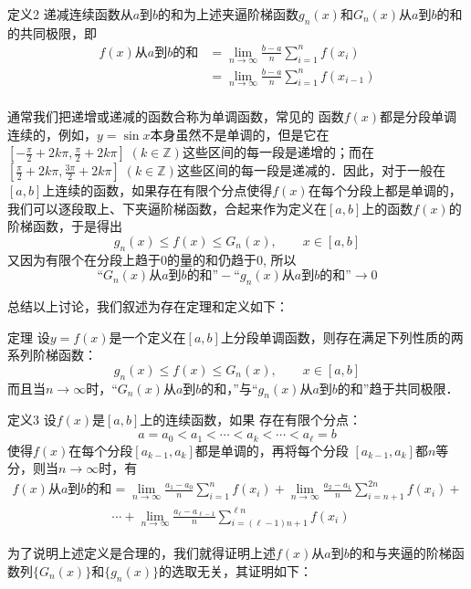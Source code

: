 \begin{blk}
    {定义2} 递减连续函数从$a$到$b$的和为上述夹逼阶梯函数$g_n(x)$和$G_n(x)$从$a$到$b$的和的共同极限，即  
\begin{align*}
    f(x)\text{从$a$到$b$的和}&=\lim_{n\to\infty} \frac{b-a}{n}\sum^n_{i=1}f(x_i)\\
    &=\lim_{n\to\infty} \frac{b-a}{n}\sum^n_{i=1}f(x_{i-1})\\
\end{align*}
\end{blk}

通常我们把递增或递减的函数合称为单调函数，常见的
函数$f(x)$都是分段单调连续的，例如，$y=\sin x$本身虽然不是单调的，但是它在$\left[-\frac{\pi}{2}+2k\pi,\frac{\pi}{2}+2k\pi\right]\; (k\in\mathbb{Z})$这些区间的每一段是递增的；而在$\left[\frac{\pi}{2}+2k\pi,\frac{3\pi}{2}+2k\pi\right]\; (k\in\mathbb{Z})$这些区间的每一段是递减的．因此，对于一般在$[a,b]$上连续的函数，如果存在有限个分点使得$f(x)$在每个分段上都是单调的，我们可以逐段取上、下夹逼阶梯函数，合起来作为定义在$[a,b]$上的函数$f(x)$的阶梯函数，于是得出
\[g_n (x)\le f(x)\le G_n(x),\qquad x\in [a,b]\]
又因为有限个在分段上趋于0的量的和仍趋于0, 所以
\[\text{“$G_n(x)$从$a$到$b$的和”}-\text{“$g_n(x)$从$a$到$b$的和”}\to 0\]

总结以上讨论，我们叙述为存在定理和定义如下：

\begin{blk}
    {定理} 设$y=f(x)$是一个定义在$[a,b]$上分段单调函数，则存在满足下列性质的两系列阶梯函数：
    \[g_n(x)\le f(x)\le G_n(x),\qquad x\in[a,b]\]
而且当$n\to\infty$时，“$G_n(x)$从$a$到$b$的和，”与“$g_n(x)$从$a$到$b$的和”趋于共同极限．
\end{blk}


\begin{blk}
    {定义3} 设$f(x)$是$[a,b]$上的连续函数，如果 存在有限个分点：
\[a=a_0<a_1<\cdots<a_k<\cdots<a_\ell=b\]
使得$f(x)$在每个分段$[a_{k-1},a_k]$都是单调的，再将每个分段
    $[a_{k-1},a_k]$都$n$等分，则当$n\to\infty$时，有
\begin{align*}
f(x)\text{从$a$到$b$的和}&=\lim_{n\to\infty}\frac{a_1-a_0}{n}\sum^n_{i=1}f(x_i)+\lim_{n\to\infty}\frac{a_2-a_1}{n}\sum^{2n}_{i=n+1}f(x_i)+\\
&\cdots +\lim_{n\to\infty}\frac{a_\ell-a_{\ell-1}}{n}\sum^{\ell n}_{i=(\ell-1)n+1}f(x_i)
\end{align*}
\end{blk}

为了说明上述定义是合理的，我们就得证明上述$f(x)$从$a$到$b$的和与夹逼的阶梯函数列$\{G_n(x)\}$和$\{g_n(x)\}$的选取无关，其证明如下：

